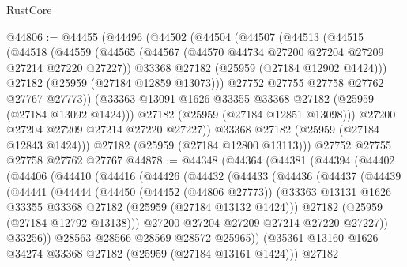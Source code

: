 \begin{lexlean}{RustCore}
\begin{coremodule}
@44806 := @44455
    (@44496
      (@44502
        (@44504
          (@44507
            (@44513
              (@44515
                (@44518
                  (@44559
                    (@44565
                      (@44567 (@44570 @44734 @27200 @27204 @27209 @27214 @27220 @27227))
                      @33368
                      @27182
                      (@25959 (@27184 @12902 @1424)))
                    @27182
                    (@25959 (@27184 @12859 @13073)))
                  @27752
                  @27755
                  @27758
                  @27762
                  @27767
                  @27773))
              (@33363 @13091 @1626 @33355 @33368 @27182 (@25959 (@27184 @13092 @1424)))
              @27182
              (@25959 (@27184 @12851 @13098)))
            @27200
            @27204
            @27209
            @27214
            @27220
            @27227))
        @33368
        @27182
        (@25959 (@27184 @12843 @1424)))
      @27182
      (@25959 (@27184 @12800 @13113)))
    @27752
    @27755
    @27758
    @27762
    @27767
@44878 := @44348
    (@44364
      (@44381
        (@44394
          (@44402
            (@44406
              (@44410
                (@44416
                  (@44426
                    (@44432
                      (@44433
                        (@44436
                          (@44437
                            (@44439
                              (@44441
                                (@44444
                                  (@44450
                                    (@44452 (@44806 @27773))
                                    (@33363
                                      @13131
                                      @1626
                                      @33355
                                      @33368
                                      @27182
                                      (@25959 (@27184 @13132 @1424)))
                                    @27182
                                    (@25959 (@27184 @12792 @13138)))
                                  @27200
                                  @27204
                                  @27209
                                  @27214
                                  @27220
                                  @27227))
                              @33256))
                          @28563
                          @28566
                          @28569
                          @28572
                          @25965))
                      (@35361 @13160 @1626 @34274 @33368 @27182 (@25959 (@27184 @13161 @1424)))
                      @27182

\end{coremodule}
\end{lexlean}
